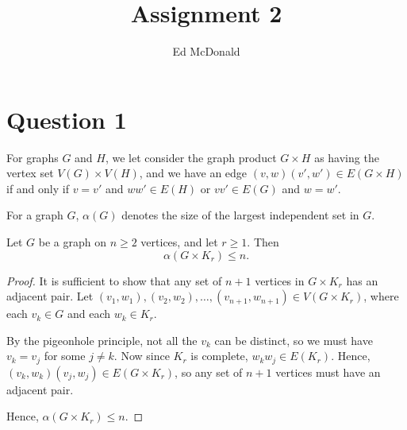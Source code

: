 \documentclass{unswmaths}
\begin{document}
\subject{Graph Theory}
\author{Ed McDonald}
\title{Assignment 2}


\setlength\parindent{0pt}


\unswtitle{}

\section*{Question 1}
For graphs $G$ and $H$, we let consider the graph
product $G\times H$ as having the vertex set $V(G)\times V(H)$,
and we have an edge $(v,w)(v',w') \in E(G\times H)$
if and only if $v = v'$ and $ww' \in E(H)$ or $vv' \in E(G)$ and $w = w'$. 

For a graph $G$, $\alpha(G)$ denotes the size of the largest independent
set in $G$.

\begin{lemma}[Part (a)]
    Let $G$ be a graph on $n \geq 2$ vertices, and let $r \geq 1$. Then
    \begin{equation*}
        \alpha(G \times K_r) \leq n.
    \end{equation*}     
\end{lemma}
\begin{proof}
    It is sufficient to show that any set of $n+1$ vertices
    in $G\times K_r$ has an adjacent pair. 
    Let $(v_1,w_1),(v_2,w_2),\ldots,(v_{n+1},w_{n+1}) \in V(G\times K_r)$,
    where each $v_k \in G$ and each $w_k \in K_r$. 
    
    By the pigeonhole principle, not all the $v_k$ can be distinct,
    so we must have $v_k = v_j$ for some $j \neq k$. Now since
    $K_r$ is complete, $w_kw_j \in E(K_r)$. Hence, $(v_k,w_k)(v_j,w_j) \in E(G\times K_r)$,
    so any set of $n+1$ vertices must have an adjacent pair.
    
    Hence, $\alpha(G\times K_r) \leq n$.    
\end{proof}
\end{document}
